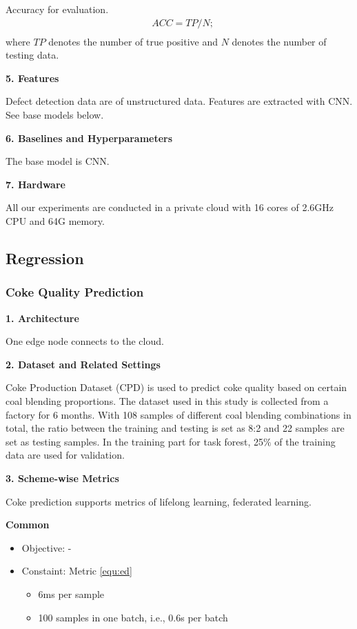 Accuracy for evaluation.
\noindent
\begin{equation*}
\begin{split}
&ACC = TP / N; \\
\end{split}
\end{equation*}
where $TP$ denotes the number of true positive and $N$ denotes the number of testing data. 

\noindent
\textbf{5. Features}

Defect detection data are of unstructured data. Features are extracted with CNN. See base models below.

\noindent
\textbf{6. Baselines and Hyperparameters}

The base model is CNN. 

\noindent
\textbf{7. Hardware}

All our experiments are conducted in a private cloud with 16 cores of 2.6GHz CPU and 64G memory.




\subsection{Regression}

\subsubsection{Coke Quality Prediction} 

\noindent
\textbf{1. Architecture}

One edge node connects to the cloud. 

\noindent
\textbf{2. Dataset and Related Settings}

Coke Production Dataset (CPD) is used to predict coke quality based on certain coal blending proportions. The dataset used in this study is collected from a factory for 6 months. With 108 samples of different coal blending combinations in total, the ratio between the training and testing is set as 8:2 and 22 samples are set as testing samples. In the training part for task forest, 25$\%$ of the training data are used for validation. 

\noindent
\textbf{3. Scheme-wise Metrics}

Coke prediction supports metrics of lifelong learning, federated learning. 

\vspace{0.2cm}
\noindent \textbf{Common}
\begin{itemize}
    \item Objective: - 
    \item Constaint: Metric \ref{equ:ed}
        \begin{itemize} 
        \item 6ms per sample 
        \item 100 samples in one batch, i.e., 0.6s per batch
        \end{itemize}
\end{itemize}

